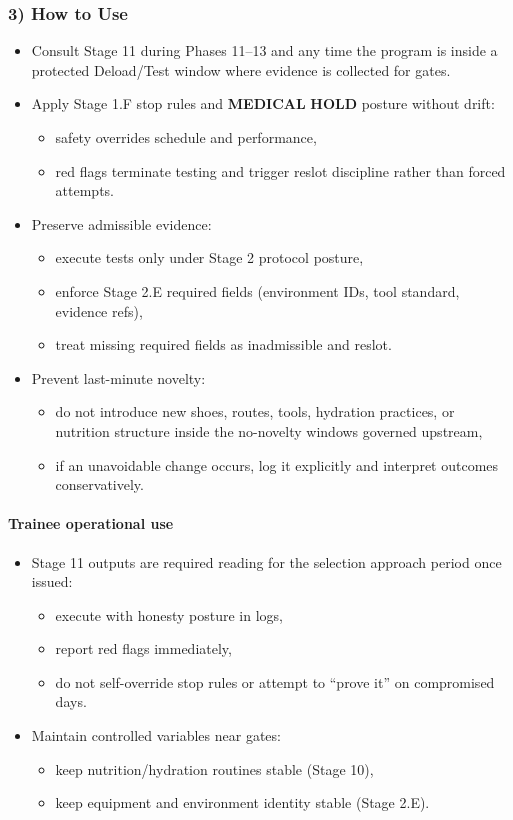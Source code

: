 \documentclass[10pt]{article}
\begin{document}
\subsubsection*{3) How to Use}

\begin{itemize}
\item Consult Stage 11 during Phases 11–13 and any time the program is inside a protected Deload/Test window where evidence is collected for gates.
\item Apply Stage 1.F stop rules and \textbf{MEDICAL} \textbf{HOLD} posture without drift:
\begin{itemize}
\item safety overrides schedule and performance,
\item red flags terminate testing and trigger reslot discipline rather than forced attempts.
\end{itemize}
\item Preserve admissible evidence:
\begin{itemize}
\item execute tests only under Stage 2 protocol posture,
\item enforce Stage 2.E required fields (environment IDs, tool standard, evidence refs),
\item treat missing required fields as inadmissible and reslot.
\end{itemize}
\item Prevent last-minute novelty:
\begin{itemize}
\item do not introduce new shoes, routes, tools, hydration practices, or nutrition structure inside the no-novelty windows governed upstream,
\item if an unavoidable change occurs, log it explicitly and interpret outcomes conservatively.
\end{itemize}
\end{itemize}

\paragraph*{Trainee operational use}

\begin{itemize}
\item Stage 11 outputs are required reading for the selection approach period once issued:
\begin{itemize}
\item execute with honesty posture in logs,
\item report red flags immediately,
\item do not self-override stop rules or attempt to “prove it” on compromised days.
\end{itemize}
\item Maintain controlled variables near gates:
\begin{itemize}
\item keep nutrition/hydration routines stable (Stage 10),
\item keep equipment and environment identity stable (Stage 2.E).
\end{itemize}
\end{itemize}
\end{document}
